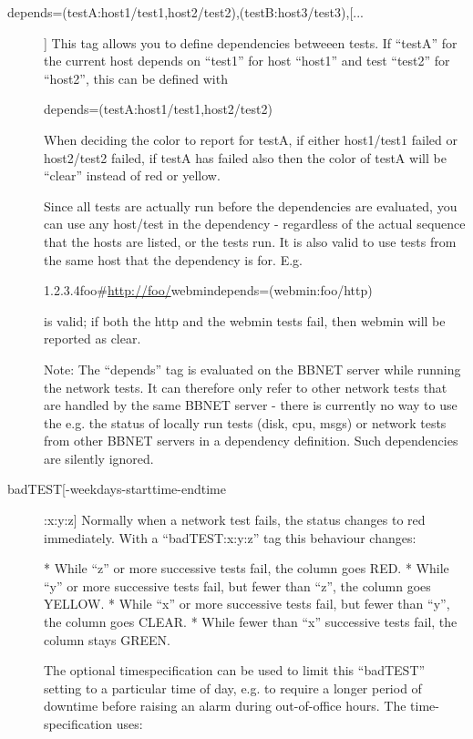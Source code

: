 \begin{description}
 

\item[depends=(testA:host1/test1,host2/test2),(testB:host3/test3),[...]]
  This tag allows you to define dependencies betweeen tests. If
  ``testA'' for the current host depends on ``test1'' for host
  ``host1'' and test ``test2'' for ``host2'', this can be defined with 


  
depends=(testA:host1/test1,host2/test2) 


  When deciding the color to report for testA, if either host1/test1
  failed or host2/test2 failed, if testA has failed also then the
  color of testA will be ``clear'' instead of red or yellow. 



  Since all tests are actually run before the dependencies are
  evaluated, you can use any host/test in the dependency - regardless
  of the actual sequence that the hosts are listed, or the tests
  run. It is also valid to use tests from the same host that the
  dependency is for. E.g. 



  
1.2.3.4foo\#\url{http://foo/}webmindepends=(webmin:foo/http) 


  is valid; if both the http and the webmin tests fail, then webmin will be reported as clear. 


  Note: The ``depends'' tag is evaluated on the BBNET server while
  running the network tests. It can therefore only refer to other
  network tests that are handled by the same BBNET server - there is
  currently no way to use the e.g. the status of locally run tests
  (disk, cpu, msgs) or network tests from other BBNET servers in a
  dependency definition. Such dependencies are silently ignored. 



\item[badTEST[-weekdays-starttime-endtime]:x:y:z] Normally when a
  network test fails, the status changes to red immediately. With a
  ``badTEST:x:y:z'' tag this behaviour changes:  

 * While ``z'' or more successive tests fail, the column goes RED.  
 * While ``y'' or more successive tests fail, but fewer than ``z'', the column goes YELLOW.  
 * While ``x'' or more successive tests fail, but fewer than ``y'', the column goes CLEAR.  
 * While fewer than ``x'' successive tests fail, the column stays GREEN. 

  The optional timespecification can be used to limit this ``badTEST''
  setting to a particular time of day, e.g. to require a longer period
  of downtime before raising an alarm during out-of-office hours. The
  time-specification uses:  


\end{description}
